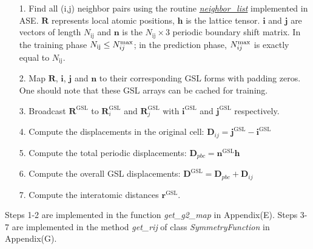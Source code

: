 \documentclass[preprint]{revtex4-2}
\begin{document}
\begin{itemize}
    
    \item[1.] 
    Find all (i,j) neighbor pairs using the routine 
    \href{https://wiki.fysik.dtu.dk/ase/ase/neighborlist.html}
    {\textit{neighbor\_list}} implemented in ASE\cite{ase}. $\mathbf{R}$ 
    represents local atomic positions, $\mathbf{h}$ is the lattice tensor. 
    $\mathbf{i}$ and $\mathbf{j}$ are vectors of length $N_{\mathrm{ij}}$ and
    $\mathbf{n}$ is the $N_{\mathrm{ij}} \times 3$ periodic boundary shift 
    matrix. In the training phase $N_{\mathrm{ij}} \le N_{ij}^{\mathrm{max}}$; in the 
    prediction phase, $N_{ij}^{\mathrm{max}}$ is exactly equal to $N_{\mathrm{ij}}$.
    
    \item[2.] 
    Map $\mathbf{R}$, $\mathbf{i}$, $\mathbf{j}$ and $\mathbf{n}$ to
    their corresponding GSL forms with padding zeros. One should note that these 
    GSL arrays can be cached for training.

    \item[3.] 
    Broadcast $\mathbf{R}^{\mathrm{GSL}}$ to $\mathbf{R}_{i}^{\mathrm{GSL}}$ and
    $\mathbf{R}_{j}^{\mathrm{GSL}}$ with $\mathbf{i}^{\mathrm{GSL}}$ and 
    $\mathbf{j}^{\mathrm{GSL}}$ respectively.

    \item[4.]
    Compute the displacements in the original cell:
    $\mathbf{D}_{ij} = \mathbf{j}^{\mathrm{GSL}} - \mathbf{i}^{\mathrm{GSL}}$
    
    \item[5.]
    Compute the total periodic displacements:
    $\mathbf{D}_{pbc} = \mathbf{n}^{\mathrm{GSL}} \mathbf{h}$
    
    \item[6.]
    Compute the overall GSL displacements:
    $\mathbf{D}^{\mathrm{GSL}} = \mathbf{D}_{pbc} + \mathbf{D}_{ij}$
    
    \item[7.] 
    Compute the interatomic distances $\mathbf{r}^{\mathrm{GSL}}$.

\end{itemize}

Steps 1-2 are implemented in the function \textit{get\_g2\_map} in Appendix(E).
Steps 3-7 are implemented in the method \textit{get\_rij} of class 
\textit{SymmetryFunction} in Appendix(G). 

% 
%
\end{document}
